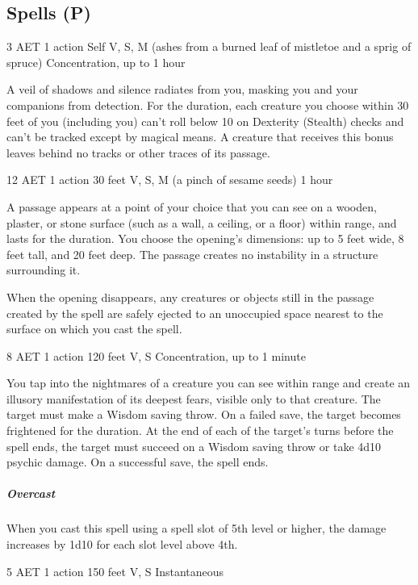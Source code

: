 \subsection{Spells (P)}

\label{spell:pass-without-trace}
{3 AET}
{1 action}
{Self}
{V, S, M (ashes from a burned leaf of mistletoe and a sprig of spruce)}
{Concentration, up to 1 hour}

A veil of shadows and silence radiates from you, masking you and your companions from detection. For the duration, each creature you choose within 30 feet of you (including you) can't roll below 10 on Dexterity (Stealth) checks and can't be tracked except by magical means. A creature that receives this bonus leaves behind no tracks or other traces of its passage.

\label{spell:passwall}
{12 AET}
{1 action}
{30 feet}
{V, S, M (a pinch of sesame seeds)}
{1 hour}

A passage appears at a point of your choice that you can see on a wooden, plaster, or stone surface (such as a wall, a ceiling, or a floor) within range, and lasts for the duration. You choose the opening's dimensions: up to 5 feet wide, 8 feet tall, and 20 feet deep. The passage creates no instability in a structure surrounding it.

When the opening disappears, any creatures or objects still in the passage created by the spell are safely ejected to an unoccupied space nearest to the surface on which you cast the spell.

\label{spell:phantasmal-killer}
{8 AET}
{1 action}
{120 feet}
{V, S}
{Concentration, up to 1 minute}

You tap into the nightmares of a creature you can see within range and create an illusory manifestation of its deepest fears, visible only to that creature. The target must make a Wisdom saving throw. On a failed save, the target becomes frightened for the duration. At the end of each of the target's turns before the spell ends, the target must succeed on a Wisdom saving throw or take 4d10 psychic damage. On a successful save, the spell ends.
\subparagraph*{Overcast} When you cast this spell using a spell slot of 5th level or higher, the damage increases by 1d10 for each slot level above 4th.

\label{spell:plant-growth}
{5 AET}
{1 action}
{150 feet}
{V, S}
{Instantaneous}

